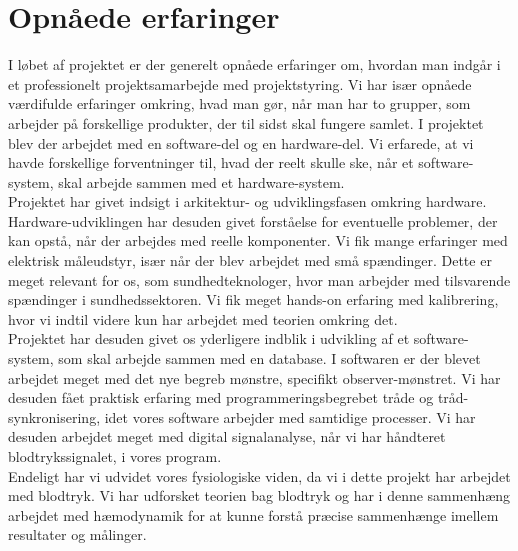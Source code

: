 \section{Opnåede erfaringer}
I løbet af projektet er der generelt opnåede erfaringer om, hvordan man indgår i et professionelt projektsamarbejde med projektstyring. Vi har især opnåede værdifulde erfaringer omkring, hvad man gør, når man har to grupper, som arbejder på forskellige produkter, der til sidst skal fungere samlet. I projektet blev der arbejdet med en software-del og en hardware-del.  Vi erfarede, at vi havde forskellige forventninger til, hvad der reelt skulle ske, når et software-system, skal arbejde sammen med et hardware-system. \\[2ex]
Projektet har givet indsigt i arkitektur- og udviklingsfasen omkring hardware. Hardware-udviklingen har desuden givet forståelse for eventuelle problemer, der kan opstå, når der arbejdes med reelle komponenter. Vi fik mange erfaringer med elektrisk måleudstyr, især når der blev arbejdet med små spændinger. Dette er meget relevant for os, som sundhedteknologer, hvor man arbejder med tilsvarende spændinger i sundhedssektoren. Vi fik meget hands-on erfaring med kalibrering, hvor vi indtil videre kun har arbejdet med teorien omkring det. \\[2ex]
Projektet har desuden givet os yderligere indblik i udvikling af et software-system, som skal arbejde sammen med en database. I softwaren er der blevet arbejdet meget med det nye begreb mønstre, specifikt observer-mønstret. Vi har desuden fået praktisk erfaring med programmeringsbegrebet tråde og tråd-synkronisering, idet vores software arbejder med samtidige processer. Vi har desuden arbejdet meget med digital signalanalyse, når vi har håndteret blodtrykssignalet, i vores program. \\[2ex]
Endeligt har vi udvidet vores fysiologiske viden, da vi i dette projekt har arbejdet med blodtryk. Vi har udforsket teorien bag  blodtryk og har i denne sammenhæng arbejdet med hæmodynamik for at kunne forstå præcise sammenhænge imellem resultater og målinger. \\

